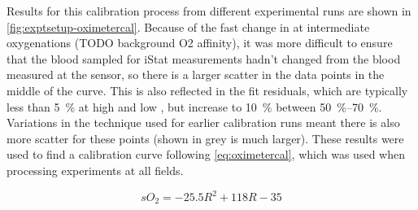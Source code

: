 Results for this calibration process from different experimental runs are shown in \autoref{fig:exptsetup-oximetercal}.
Because of the fast change in \SOtwo at intermediate oxygenations (TODO background O2 affinity), it was more difficult to ensure that the blood sampled for iStat measurements hadn't changed from the blood measured at the sensor, so there is a larger scatter in the data points in the middle of the curve.
This is also reflected in the fit residuals, which are typically less than \SI{5}{\percent} at high and low \SOtwo, but increase to \SI{10}{\percent} between \SIrange{50}{70}{\percent}.
Variations in the technique used for earlier calibration runs meant there is also more scatter for these points (shown in grey is much larger).
These results were used to find a calibration curve following \autoref{eq:oximetercal}, which was used when processing experiments at all fields.

\begin{equation}
\mathit{sO_2} = -25.5 R^2 + 118 R - 35
\label{eq:oximetercal}
\end{equation}

